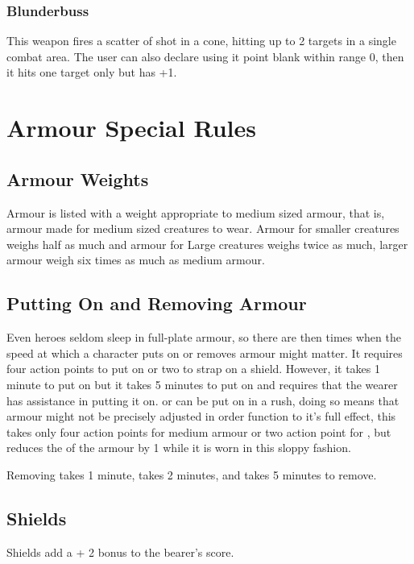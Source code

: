 \subsubsection{Blunderbuss}
This weapon fires a scatter of shot in a cone, hitting up to 2 targets in a single combat area. The user can also declare using it point blank within range 0, then it hits one target only but has  +1.





\section{Armour Special Rules}
\label{sec:armspec}

\subsection{Armour Weights}
Armour is listed with a weight appropriate to medium sized armour, that is, armour made for medium sized creatures to wear. Armour for smaller creatures weighs half as much and armour for Large creatures weighs twice as much, larger armour weigh six times as much as medium armour.


\subsection{Putting On and Removing Armour}
Even heroes seldom sleep in full-plate armour, so there are then times when the speed at which a character puts on or removes armour might matter. It requires four action points to put on  or two to strap on a shield. However, it takes 1 minute to put on  but it takes 5 minutes to put on  and requires that the wearer has assistance in putting it on.  or  can be put on in a rush, doing so means that armour might not be precisely adjusted in order function to it's full effect, this takes only four action points for medium armour or two action point for , but reduces the  of the armour by 1 while it is worn in this sloppy fashion.

Removing  takes 1 minute,  takes 2 minutes, and  takes 5 minutes to remove.


\subsection{Shields}
\label{sec:shields}
Shields add a + 2 bonus to the bearer's  score. 


